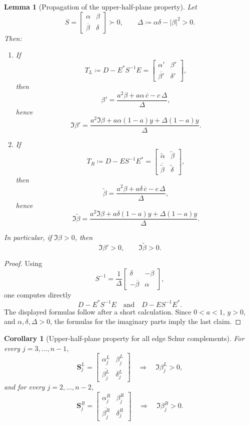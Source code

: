 \documentclass[11pt]{article}
\newtheorem{lemma}[theorem]{Lemma}
\newtheorem{corollary}[theorem]{Corollary}
\begin{document}
\begin{lemma}[Propagation of the upper-half-plane property]\label{lem:beta-propagation-final}
Let
\[
S=
\begin{bmatrix}
\alpha&\beta\\
\overline\beta&\delta
\end{bmatrix}\succ0,
\qquad
\Delta\coloneqq \alpha\delta-|\beta|^2>0.
\]
Then:
\begin{enumerate}
\item If
\[
T_L\coloneqq D-E^*S^{-1}E=
\begin{bmatrix}
\alpha'&\beta'\\
\overline{\beta'}&\delta'
\end{bmatrix},
\]
then
\[
\beta'=\frac{a^2\beta+a\alpha\,\overline c-c\,\Delta}{\Delta},
\]
hence
\[
\Im\beta'
=
\frac{a^2\Im\beta+a\alpha(1-a)y+\Delta(1-a)y}{\Delta}.
\]

\item If
\[
T_R\coloneqq D-ES^{-1}E^*=
\begin{bmatrix}
\widetilde\alpha&\widetilde\beta\\
\overline{\widetilde\beta}&\widetilde\delta
\end{bmatrix},
\]
then
\[
\widetilde\beta=\frac{a^2\beta+a\delta\,\overline c-c\,\Delta}{\Delta},
\]
hence
\[
\Im\widetilde\beta
=
\frac{a^2\Im\beta+a\delta(1-a)y+\Delta(1-a)y}{\Delta}.
\]
\end{enumerate}
In particular, if \(\Im\beta>0\), then
\[
\Im\beta'>0,
\qquad
\Im\widetilde\beta>0.
\]
\end{lemma}

\begin{proof}
Using
\[
S^{-1}
=
\frac1\Delta
\begin{bmatrix}
\delta&-\beta\\
-\overline\beta&\alpha
\end{bmatrix},
\]
one computes directly
\[
D-E^*S^{-1}E
\quad\text{and}\quad
D-ES^{-1}E^*.
\]
The displayed formulas follow after a short calculation. Since \(0<a<1\), \(y>0\), and
\(\alpha,\delta,\Delta>0\), the formulas for the imaginary parts imply the last claim.
\end{proof}

\begin{corollary}[Upper-half-plane property for all edge Schur complements]\label{cor:beta-upper-half-plane-final}
For every \(j=3,\dots,n-1\),
\[
\mathbf S_j^L=
\begin{bmatrix}
\alpha_j^L&\beta_j^L\\
\overline{\beta_j^L}&\delta_j^L
\end{bmatrix}
\quad\Longrightarrow\quad
\Im\beta_j^L>0,
\]
and for every \(j=2,\dots,n-2\),
\[
\mathbf S_j^R=
\begin{bmatrix}
\alpha_j^R&\beta_j^R\\
\overline{\beta_j^R}&\delta_j^R
\end{bmatrix}
\quad\Longrightarrow\quad
\Im\beta_j^R>0.
\]
\end{corollary}
\end{document}

